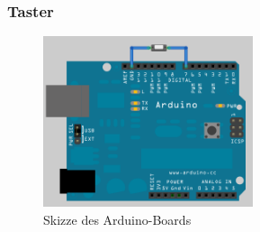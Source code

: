 \documentclass[a4paper,12pt,headsepline]{scrartcl}
\begin{document}
			
	\subsubsection{Taster}
\begin{figure} [H]
\centering
\includegraphics[height=5cm]{Images/button_hardware.png}
\caption{Skizze des Arduino-Boards}
\label{fig:arduinotaster}
\end{figure}
	
\end{document}
